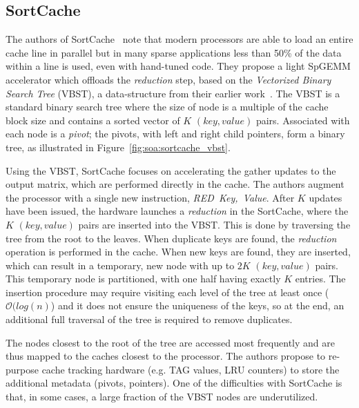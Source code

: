 
\subsection{SortCache}
\label{sec:soa:sortcache}

The authors of SortCache~\cite{Srikanth2021_SortCache} note that modern processors are able to load an entire cache line in parallel but in many sparse applications less than 50\% of the data within a line is used, even with hand-tuned code. They propose a light SpGEMM accelerator which offloads the \emph{reduction} step, based on the \emph{Vectorized Binary Search Tree} (VBST), a data-structure from their earlier work~\cite{Srikanth2017_SuperStrider,Srikanth2019_MetaStrider}.
The VBST is a standard binary search tree where the size of node is a multiple of the cache block size and contains a sorted vector of $K$ $(key, value)$ pairs. Associated with each node is a \emph{pivot}; the pivots, with left and right child pointers, form a binary tree, as illustrated in Figure~\ref{fig:soa:sortcache_vbst}.


Using the VBST, SortCache focuses on accelerating the \gls{gather} updates to the output matrix, which are performed directly in the cache. The authors augment the processor with a single new instruction, \mbox{\emph{RED Key, Value}}. After $K$ updates have been issued, the hardware launches a \emph{reduction} in the SortCache, where the $K$ $(key, value)$ pairs are inserted into the VBST. This is done by traversing the tree from the root to the leaves. When duplicate keys are found, the \emph{reduction} operation is performed in the cache. When new keys are found, they are inserted, which can result in a temporary, new node with up to $2K$ $(key, value)$ pairs. This temporary node is partitioned, with one half having exactly $K$ entries. The insertion procedure may require visiting each level of the tree at least once ($\mathcal{O}(log(n)$) and it does not ensure the uniqueness of the keys, so at the end, an additional full traversal of the tree is required to remove duplicates.

The nodes closest to the root of the tree are accessed most frequently and are thus mapped to the caches closest to the processor. The authors propose to re-purpose cache tracking hardware (e.g. TAG values, LRU counters) to store the additional metadata (pivots, pointers). One of the difficulties with SortCache is that, in some cases, a large fraction of the VBST nodes are underutilized.